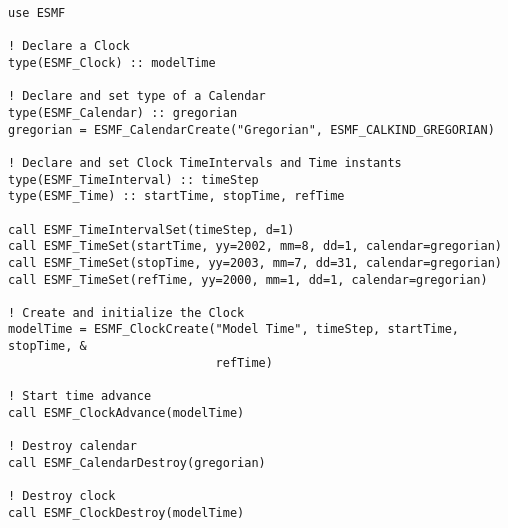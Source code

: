 
\begin{verbatim}
use ESMF

! Declare a Clock
type(ESMF_Clock) :: modelTime

! Declare and set type of a Calendar
type(ESMF_Calendar) :: gregorian
gregorian = ESMF_CalendarCreate("Gregorian", ESMF_CALKIND_GREGORIAN)

! Declare and set Clock TimeIntervals and Time instants
type(ESMF_TimeInterval) :: timeStep
type(ESMF_Time) :: startTime, stopTime, refTime

call ESMF_TimeIntervalSet(timeStep, d=1)
call ESMF_TimeSet(startTime, yy=2002, mm=8, dd=1, calendar=gregorian)
call ESMF_TimeSet(stopTime, yy=2003, mm=7, dd=31, calendar=gregorian)
call ESMF_TimeSet(refTime, yy=2000, mm=1, dd=1, calendar=gregorian)

! Create and initialize the Clock
modelTime = ESMF_ClockCreate("Model Time", timeStep, startTime, stopTime, &
                             refTime)

! Start time advance
call ESMF_ClockAdvance(modelTime)

! Destroy calendar
call ESMF_CalendarDestroy(gregorian)

! Destroy clock
call ESMF_ClockDestroy(modelTime)
\end{verbatim}
